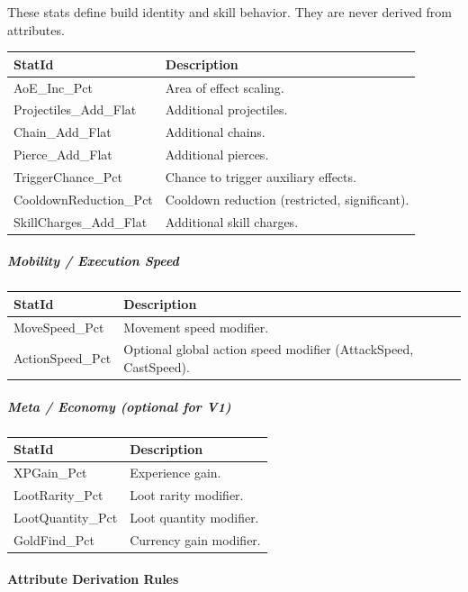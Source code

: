 These stats define build identity and skill behavior. They are never derived from attributes.

\begin{tabular}{l|p{10cm}}
	\textbf{StatId} & \textbf{Description} \\ \hline
	AoE\_Inc\_Pct & Area of effect scaling. \\
	Projectiles\_Add\_Flat & Additional projectiles. \\
	Chain\_Add\_Flat & Additional chains. \\
	Pierce\_Add\_Flat & Additional pierces. \\
	TriggerChance\_Pct & Chance to trigger auxiliary effects. \\
	CooldownReduction\_Pct & Cooldown reduction (restricted, significant). \\
	SkillCharges\_Add\_Flat & Additional skill charges. \\
\end{tabular}

\subparagraph{Mobility / Execution Speed}

\begin{tabular}{l|l}
	\textbf{StatId} & \textbf{Description} \\ \hline
	MoveSpeed\_Pct & Movement speed modifier. \\
	ActionSpeed\_Pct & Optional global action speed modifier (AttackSpeed, CastSpeed). \\
\end{tabular}

\subparagraph{Meta / Economy (optional for V1)}

\begin{tabular}{l|l}
	\textbf{StatId} & \textbf{Description} \\ \hline
	XPGain\_Pct & Experience gain. \\
	LootRarity\_Pct & Loot rarity modifier. \\
	LootQuantity\_Pct & Loot quantity modifier. \\
	GoldFind\_Pct & Currency gain modifier. \\
\end{tabular}

\paragraph{Attribute Derivation Rules}

